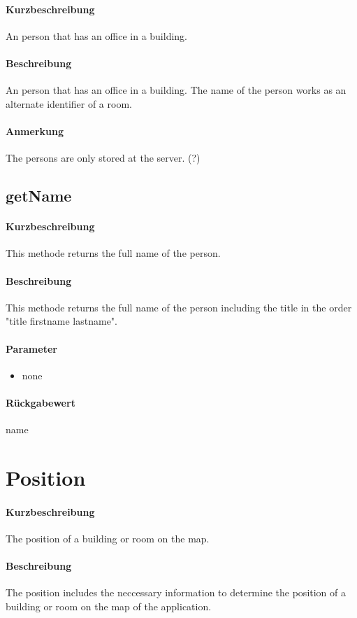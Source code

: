 \paragraph*{Kurzbeschreibung}
An person that has an office in a building.
\paragraph*{Beschreibung}
An person that has an office in a building. The name of the person works as an alternate identifier of a room.
\paragraph*{Anmerkung}
The persons are only stored at the server. (?)

\subsection{getName}%
\paragraph*{Kurzbeschreibung}
This methode returns the full name of the person.
\paragraph*{Beschreibung}
This methode returns the full name of the person including the title in the order "title firstname lastname".
\paragraph*{Parameter}
\begin{itemize}
    \item none
\end{itemize}
\paragraph*{Rückgabewert}
name


\section{Position}
\paragraph*{Kurzbeschreibung}
The position of a building or room on the map.
\paragraph*{Beschreibung}
The position includes the neccessary information to determine the position of a building or room on the map of the application.
